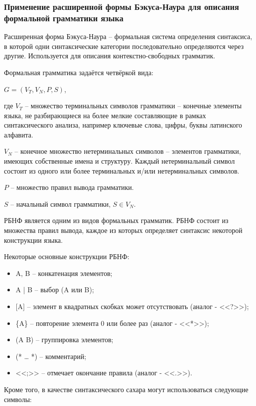 \subsubsection{Применение расширенной формы Бэкуса-Наура для описания формальной грамматики языка}

Расширенная форма Бэкуса-Наура – формальная система определения синтаксиса,
в которой одни синтаксические категории последовательно определяются через другие.
Используется для описания контекстно-свободных грамматик.

Формальная грамматика задаётся четвёркой вида:

\(G = (V_T, V_N, P, S)\),

где \(V_T\) -- множество терминальных символов грамматики – конечные
элементы языка, не разбирающиеся на более мелкие составляющие в рамках
синтаксического анализа, например ключевые слова, цифры, буквы
латинского алфавита.

\(V_N\) -- конечное множество нетерминальных символов – элементов грамматики, имеющих собственные имена и структуру.
Каждый нетерминальный символ состоит из одного или более терминальных и/или нетерминальных символов.

\(P\) -- множество правил вывода грамматики.

\(S\) -- начальный символ грамматики, \(S \in V_N\).

РБНФ является одним из видов формальных грамматик.
РБНФ состоит из множества правил вывода, каждое из которых определяет синтаксис некоторой конструкции языка.

Некоторые основные конструкции РБНФ:

\begin{itemize}
    \item A, B -- конкатенация элементов;
    \item A | B -- выбор (A или B);
    \item {[A]} -- элемент в квадратных скобках может отсутствовать (аналог - <<?>>);
    \item \{A\} -- повторение элемента 0 или более раз (аналог - <<*>>);
    \item (A B) -- группировка элементов;
    \item (* … *) – комментарий;
    \item <<;>> – отмечает окончание правила (аналог - <<.>>).
\end{itemize}

Кроме того, в качестве синтаксического сахара могут использоваться следующие символы:

